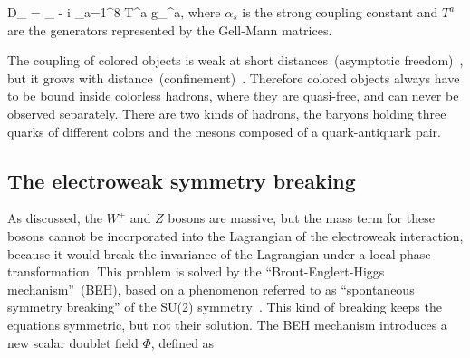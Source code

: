 {
   D_{\mu} = \partial_{\mu} - i \sum_{a=1}^{8} T^{a} g_{\mu}^{a}, 
}
where $\alpha_{s}$ is the strong coupling constant and $T^{a}$ are the generators represented by the Gell-Mann matrices. 

The coupling of colored objects is weak at short distances~(asymptotic freedom)~\cite{Gross:1973id}, but it grows with distance~(confinement)~\cite{Wilson:1974sk}. Therefore colored objects always have to be bound inside colorless hadrons, where they are quasi-free, and can never be observed separately. There are two kinds of hadrons, the baryons holding three quarks of different colors and the mesons composed of a quark-antiquark pair.





\subsection{The electroweak symmetry breaking~\label{sec:EWbreaking}}

As discussed, the $W^{\pm}$ and $Z$ bosons are massive, but the mass term for these bosons cannot be incorporated into the Lagrangian of the electroweak interaction, because it would break the invariance of the Lagrangian under a local phase transformation. This problem is solved by the ``Brout-Englert-Higgs mechanism''~(BEH), based on a phenomenon referred to as ``spontaneous symmetry breaking'' of the SU(2) symmetry~\cite{Englert:1964et, Guralnik:1964eu}. This kind of breaking keeps the equations symmetric, but not their solution. The BEH mechanism introduces a new scalar doublet field $\Phi$, defined as

